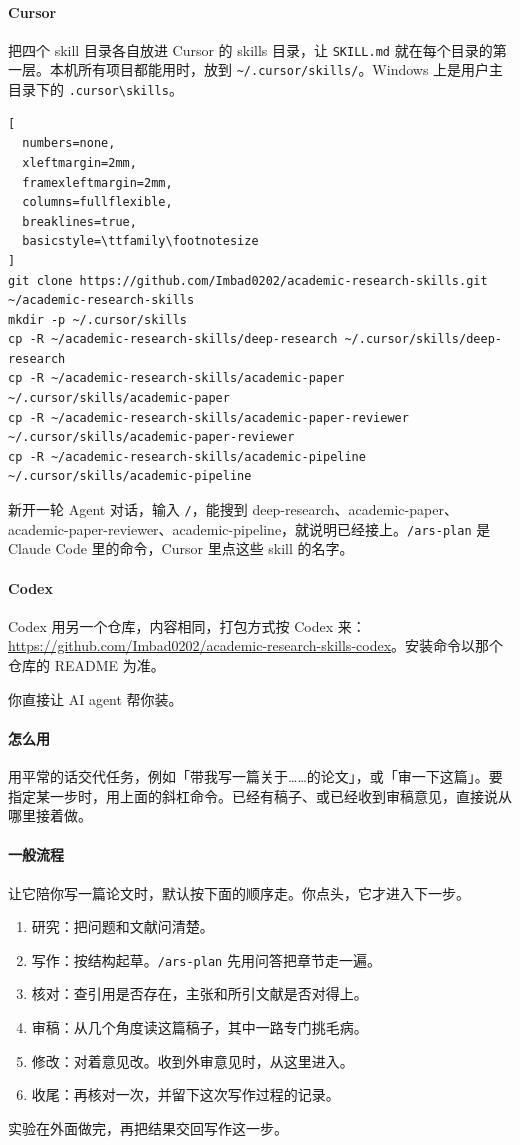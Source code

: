 \paragraph{Cursor}
把四个 skill 目录各自放进 Cursor 的 skills 目录，让 \verb|SKILL.md| 就在每个目录的第一层。本机所有项目都能用时，放到 \verb|~/.cursor/skills/|。Windows 上是用户主目录下的 \verb|.cursor\skills|。
\begin{lstlisting}[
  numbers=none,
  xleftmargin=2mm,
  framexleftmargin=2mm,
  columns=fullflexible,
  breaklines=true,
  basicstyle=\ttfamily\footnotesize
]
git clone https://github.com/Imbad0202/academic-research-skills.git ~/academic-research-skills
mkdir -p ~/.cursor/skills
cp -R ~/academic-research-skills/deep-research ~/.cursor/skills/deep-research
cp -R ~/academic-research-skills/academic-paper ~/.cursor/skills/academic-paper
cp -R ~/academic-research-skills/academic-paper-reviewer ~/.cursor/skills/academic-paper-reviewer
cp -R ~/academic-research-skills/academic-pipeline ~/.cursor/skills/academic-pipeline
\end{lstlisting}
新开一轮 Agent 对话，输入 \verb|/|，能搜到 deep-research、academic-paper、academic-paper-reviewer、academic-pipeline，就说明已经接上。\verb|/ars-plan| 是 Claude Code 里的命令，Cursor 里点这些 skill 的名字。

\paragraph{Codex}
Codex 用另一个仓库，内容相同，打包方式按 Codex 来：\url{https://github.com/Imbad0202/academic-research-skills-codex}。安装命令以那个仓库的 README 为准。

\begin{xiaonao}
你直接让 AI agent 帮你装。
\end{xiaonao}

\paragraph{怎么用}
用平常的话交代任务，例如「带我写一篇关于……的论文」，或「审一下这篇」。要指定某一步时，用上面的斜杠命令。已经有稿子、或已经收到审稿意见，直接说从哪里接着做。

\paragraph{一般流程}
让它陪你写一篇论文时，默认按下面的顺序走。你点头，它才进入下一步。
\begin{enumerate}
\item 研究：把问题和文献问清楚。
\item 写作：按结构起草。\verb|/ars-plan| 先用问答把章节走一遍。
\item 核对：查引用是否存在，主张和所引文献是否对得上。
\item 审稿：从几个角度读这篇稿子，其中一路专门挑毛病。
\item 修改：对着意见改。收到外审意见时，从这里进入。
\item 收尾：再核对一次，并留下这次写作过程的记录。
\end{enumerate}
实验在外面做完，再把结果交回写作这一步。

